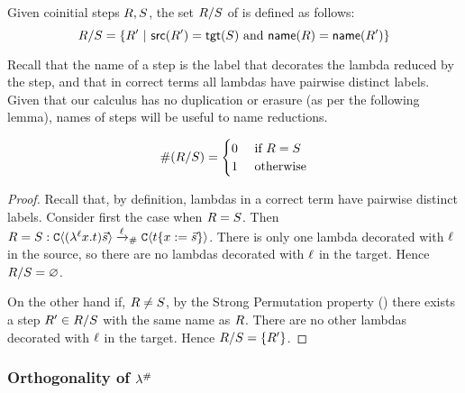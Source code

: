\begin{definition}
Given coinitial steps $R, S$,
the set $R/S$ of  is defined as follows:
\[
  R/S = \{R' \ |\  \mathsf{src}(R') = \mathsf{tgt}(S) \text{ and } \mathsf{name}(R) = \mathsf{name}(R')\}
\]
\end{definition}

\begin{remark}
Recall that the name of a step is the label that decorates the lambda reduced by the step,
and that in correct terms all lambdas have pairwise distinct labels.
Given that our calculus has no duplication or erasure (as per the following lemma),
names of steps will be useful to name reductions.
\end{remark}


\begin{lemma}
\[
  \#(R/S) = \begin{cases}
                         0 & \text{ if $R = S$} \\
                         1 & \text{ otherwise}
                         \end{cases}
\]
\end{lemma}
\begin{proof}
Recall that, by definition, lambdas in a correct term have pairwise distinct labels.
Consider first the case when $R = S$.
Then
$
  R = S : \mathtt{C}\langle(\lambda^{\ell} x. t)\vec{s}\rangle \mathrel{\xrightarrow{\ell}_{\mathtt{\#}}} \mathtt{C}\langle t\{x := \vec{s}\}\rangle
$.
There is only one lambda decorated with $\ell$ in the source,
so there are no lambdas decorated with $\ell$ in the target.
Hence $R/S = \varnothing$.

On the other hand if, $R \neq S$,
by the Strong Permutation property ()
there exists a step $R' \in R/S$
with the same name as $R$.
There are no other lambdas decorated with $\ell$ in the target.
Hence $R/S = \{R'\}$.
\end{proof}

\subsubsection{Orthogonality of $\lambda^{\mathtt{\#}}$}



